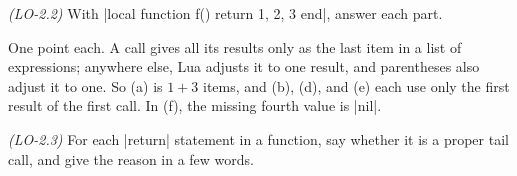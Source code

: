 \documentclass[11pt,addpoints]{exam}
\begin{document}
\begin{questions}
\question[6] \textit{(LO-2.2)} With \code|local function f() return 1, 2, 3 end|, answer each
part.


\begin{solution}
One point each. A call gives all its results only as the last item in a list of expressions;
anywhere else, Lua adjusts it to one result, and parentheses also adjust it to one. So (a) is
$1 + 3$ items, and (b), (d), and (e) each use only the first result of the first call. In (f),
the missing fourth value is \code|nil|.
\end{solution}

\question[4] \textit{(LO-2.3)} For each \code|return| statement in a function, say whether it
is a proper tail call, and give the reason in a few words.


\end{questions}
\end{document}
